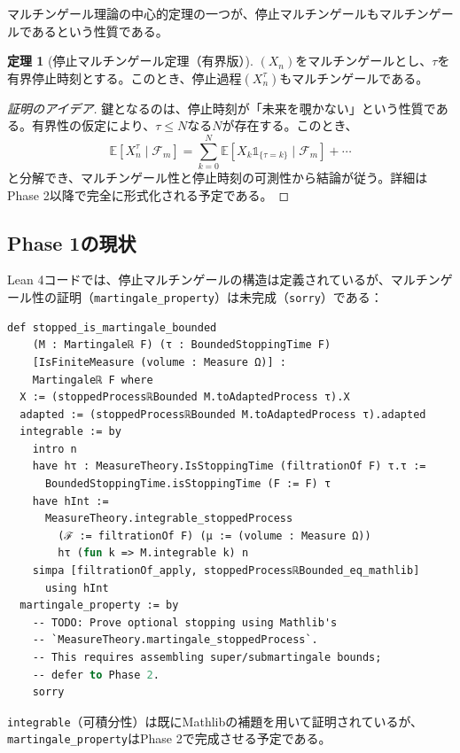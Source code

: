 \documentclass[a4paper,11pt]{ltjsarticle}
\theoremstyle{definition}
\newtheorem{theorem}[definition]{定理}
\begin{document}
マルチンゲール理論の中心的定理の一つが、停止マルチンゲールもマルチンゲールであるという性質である。

\begin{theorem}[停止マルチンゲール定理（有界版）]
$(X_n)$をマルチンゲールとし、$\tau$を有界停止時刻とする。このとき、停止過程$(X^{\tau}_n)$もマルチンゲールである。
\end{theorem}

\begin{proof}[証明のアイデア]
鍵となるのは、停止時刻が「未来を覗かない」という性質である。有界性の仮定により、$\tau \leq N$なる$N$が存在する。このとき、
\[
\mathbb{E}[X^{\tau}_n \mid \mathcal{F}_m] = \sum_{k=0}^{N} \mathbb{E}[X_k \mathbb{1}_{\{\tau=k\}} \mid \mathcal{F}_m] + \cdots
\]
と分解でき、マルチンゲール性と停止時刻の可測性から結論が従う。詳細はPhase 2以降で完全に形式化される予定である。
\end{proof}

\subsection{Phase 1の現状}

Lean 4コードでは、停止マルチンゲールの構造は定義されているが、マルチンゲール性の証明（\texttt{martingale\_property}）は未完成（\texttt{sorry}）である：

\begin{lstlisting}[style=leanstyle,language=ML,caption={stopped\_is\_martingale\_bounded（未完成）}]
def stopped_is_martingale_bounded
    (M : Martingaleℝ F) (τ : BoundedStoppingTime F)
    [IsFiniteMeasure (volume : Measure Ω)] :
    Martingaleℝ F where
  X := (stoppedProcessℝBounded M.toAdaptedProcess τ).X
  adapted := (stoppedProcessℝBounded M.toAdaptedProcess τ).adapted
  integrable := by
    intro n
    have hτ : MeasureTheory.IsStoppingTime (filtrationOf F) τ.τ :=
      BoundedStoppingTime.isStoppingTime (F := F) τ
    have hInt :=
      MeasureTheory.integrable_stoppedProcess
        (ℱ := filtrationOf F) (μ := (volume : Measure Ω))
        hτ (fun k => M.integrable k) n
    simpa [filtrationOf_apply, stoppedProcessℝBounded_eq_mathlib]
      using hInt
  martingale_property := by
    -- TODO: Prove optional stopping using Mathlib's
    -- `MeasureTheory.martingale_stoppedProcess`.
    -- This requires assembling super/submartingale bounds;
    -- defer to Phase 2.
    sorry
\end{lstlisting}

\texttt{integrable}（可積分性）は既にMathlibの補題を用いて証明されているが、\texttt{martingale\_property}はPhase 2で完成させる予定である。
\end{document}
